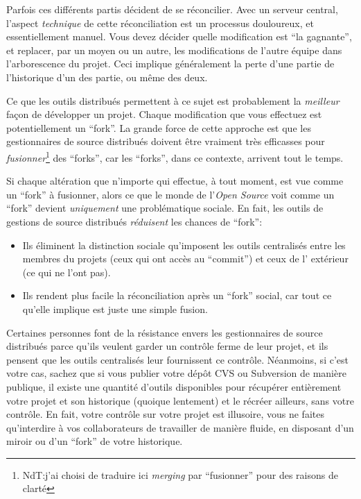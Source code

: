 Parfois ces différents partis décident de se réconcilier. Avec un 
serveur central, l'aspect \emph{technique} de cette réconciliation
est un processus douloureux, et essentiellement manuel. Vous devez
décider quelle modification est ``la gagnante'', et replacer, par un
moyen ou un autre, les modifications de l'autre équipe dans l'arborescence
du projet. Ceci implique généralement la perte d'une partie de l'historique 
d'un des partie, ou même des deux.

Ce que les outils distribués permettent à ce sujet est probablement
la \emph{meilleur} façon de développer un projet. Chaque modification
que vous effectuez est potentiellement un ``fork''. La grande force de 
cette approche est que les gestionnaires de source distribués doivent être
vraiment très efficasses pour \emph{fusionner}\footnote{NdT:j'ai choisi de
traduire ici \textit{merging} par ``fusionner'' pour des raisons de clarté}
des ``forks'', car les ``forks'', dans ce contexte, arrivent tout le
temps.

Si chaque altération que n'importe qui effectue, à tout moment, est vue
comme un ``fork'' à fusionner, alors ce que le monde de l'\textit{Open 
Source} voit comme un ``fork'' devient \emph{uniquement} une problématique 
sociale. En fait, les outils de gestions de source distribués \emph{réduisent} 
les chances de ``fork'':
\begin{itemize}
\item Ils éliminent la distinction sociale qu'imposent les outils centralisés
	entre les membres du projets (ceux qui ont accès au ``commit'') et ceux de l'
	extérieur (ce qui ne l'ont pas).
\item Ils rendent plus facile la réconciliation après un ``fork'' social, car
	tout ce qu'elle implique est juste une simple fusion.
\end{itemize}

Certaines personnes font de la résistance envers les gestionnaires de source
distribués parce qu'ils veulent garder un contrôle ferme de leur projet, et
ils pensent que les outils centralisés leur fournissent ce contrôle. Néanmoins,
si c'est votre cas, sachez que si vous publier votre dépôt CVS ou Subversion
de manière publique, il existe une quantité d'outils disponibles pour récupérer
entièrement votre projet et son historique (quoique lentement) et le récréer 
ailleurs, sans votre contrôle. En fait, votre contrôle sur votre projet est 
illusoire, vous ne faites qu'interdire à vos collaborateurs de travailler
de manière fluide, en disposant d'un miroir ou d'un ``fork'' de votre
historique.

